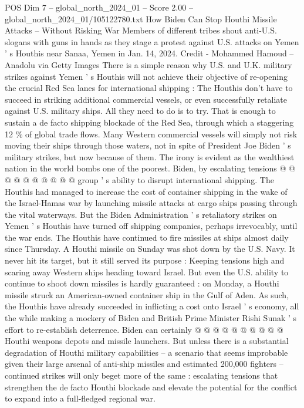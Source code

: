 \begin{textsample}{POS Dim 7 – global\_north\_2024\_01 – Score 2.00 – global\_north\_2024\_01/105122780.txt}  \label{ex:f7_pos_247}
How Biden Can Stop Houthi Missile Attacks -- Without Risking War Members of different tribes shout anti-U.S. slogans with guns in hands as they stage a protest against U.S. attacks on Yemen ' s Houthis near Sanaa, Yemen in Jan. 14, 2024.
Credit - Mohammed Hamoud -- Anadolu via Getty Images There is a simple reason why U.S. and U.K. military strikes against Yemen ' s Houthis will not achieve their objective of re-opening the crucial Red Sea lanes for international shipping : The Houthis don't have to succeed in striking additional commercial vessels, or even successfully retaliate against U.S. military ships.
All they need to do is to try.
That is enough to sustain a de facto shipping blockade of the Red Sea, through which a staggering 12 \% of global trade flows.
Many Western commercial vessels will simply not risk moving their ships through those waters, not in spite of President Joe Biden ' s military strikes, but now because of them.
The irony is evident as the wealthiest nation in the world bombs one of the poorest.
Biden, by escalating tensions @ @ @ @ @ @ @ @ @ @ group ' s ability to disrupt international shipping.
The Houthis had managed to increase the cost of container shipping in the wake of the Israel-Hamas war by launching missile attacks at cargo ships passing through the vital waterways.
But the Biden Administration ' s retaliatory strikes on Yemen ' s Houthis have turned off shipping companies, perhaps irrevocably, until the war ends.
The Houthis have continued to fire missiles at ships almost daily since Thursday.
A Houthi missile on Sunday was shot down by the U.S.
Navy.
It never hit its target, but it still served its purpose : Keeping tensions high and scaring away Western ships heading toward Israel.
But even the U.S. ability to continue to shoot down missiles is hardly guaranteed : on Monday, a Houthi missile struck an American-owned container ship in the Gulf of Aden.
As such, the Houthis have already succeeded in inflicting a cost onto Israel ' s economy, all the while making a mockery of Biden and British Prime Minister Rishi Sunak ' s effort to re-establish deterrence.
Biden can certainly @ @ @ @ @ @ @ @ @ @ Houthi weapons depots and missile launchers.
But unless there is a substantial degradation of Houthi military capabilities -- a scenario that seems improbable given their large arsenal of anti-ship missiles and estimated 200,000 fighters -- continued strikes will only beget more of the same : escalating tensions that strengthen the de facto Houthi blockade and elevate the potential for the conflict to expand into a full-fledged regional war.

\end{textsample}
